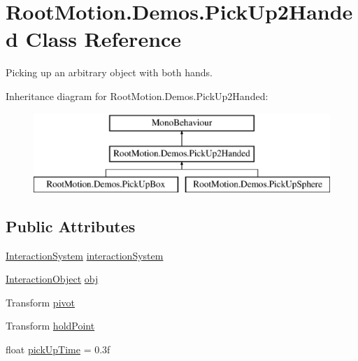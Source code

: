 \hypertarget{class_root_motion_1_1_demos_1_1_pick_up2_handed}{}\section{Root\+Motion.\+Demos.\+Pick\+Up2\+Handed Class Reference}
\label{class_root_motion_1_1_demos_1_1_pick_up2_handed}


Picking up an arbitrary object with both hands.  


Inheritance diagram for Root\+Motion.\+Demos.\+Pick\+Up2\+Handed\+:\begin{figure}[H]
\begin{center}
\leavevmode
\includegraphics[height=3.000000cm]{class_root_motion_1_1_demos_1_1_pick_up2_handed}
\end{center}
\end{figure}
\subsection*{Public Attributes}
\begin{DoxyCompactItemize}
\item 
\mbox{\hyperlink{class_root_motion_1_1_final_i_k_1_1_interaction_system}{Interaction\+System}} \mbox{\hyperlink{class_root_motion_1_1_demos_1_1_pick_up2_handed_afee897ba4efff6662a125abceec7e8ef}{interaction\+System}}
\item 
\mbox{\hyperlink{class_root_motion_1_1_final_i_k_1_1_interaction_object}{Interaction\+Object}} \mbox{\hyperlink{class_root_motion_1_1_demos_1_1_pick_up2_handed_a39ddc91c7b60ec4325b5bf2e41d17235}{obj}}
\item 
Transform \mbox{\hyperlink{class_root_motion_1_1_demos_1_1_pick_up2_handed_a239a14c23e808948ba9f7dc1a61943d1}{pivot}}
\item 
Transform \mbox{\hyperlink{class_root_motion_1_1_demos_1_1_pick_up2_handed_ae8270a679bca0c0c6fb943bd19c3304a}{hold\+Point}}
\item 
float \mbox{\hyperlink{class_root_motion_1_1_demos_1_1_pick_up2_handed_a37486617c91a86f13c2a22377a04fbc0}{pick\+Up\+Time}} = 0.\+3f
\end{DoxyCompactItemize}
